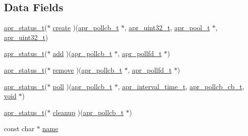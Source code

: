\subsection*{Data Fields}
\begin{DoxyCompactItemize}
\item 
\hyperlink{group__apr__errno_gaa5105fa83cc322f09382292db8b47593}{apr\+\_\+status\+\_\+t}($\ast$ \hyperlink{structapr__pollcb__provider__t_a692a11334282a65e72bae9b9ecb618bf}{create} )(\hyperlink{structapr__pollcb__t}{apr\+\_\+pollcb\+\_\+t} $\ast$, \hyperlink{group__apr__platform_ga558548a135d8a816c4787250744ea147}{apr\+\_\+uint32\+\_\+t}, \hyperlink{structapr__pool__t}{apr\+\_\+pool\+\_\+t} $\ast$, \hyperlink{group__apr__platform_ga558548a135d8a816c4787250744ea147}{apr\+\_\+uint32\+\_\+t})
\item 
\hyperlink{group__apr__errno_gaa5105fa83cc322f09382292db8b47593}{apr\+\_\+status\+\_\+t}($\ast$ \hyperlink{structapr__pollcb__provider__t_af48d581c174c9342b25425d6534a9a38}{add} )(\hyperlink{structapr__pollcb__t}{apr\+\_\+pollcb\+\_\+t} $\ast$, \hyperlink{structapr__pollfd__t}{apr\+\_\+pollfd\+\_\+t} $\ast$)
\item 
\hyperlink{group__apr__errno_gaa5105fa83cc322f09382292db8b47593}{apr\+\_\+status\+\_\+t}($\ast$ \hyperlink{structapr__pollcb__provider__t_a587ac036405acca0125e4cb32571683d}{remove} )(\hyperlink{structapr__pollcb__t}{apr\+\_\+pollcb\+\_\+t} $\ast$, \hyperlink{structapr__pollfd__t}{apr\+\_\+pollfd\+\_\+t} $\ast$)
\item 
\hyperlink{group__apr__errno_gaa5105fa83cc322f09382292db8b47593}{apr\+\_\+status\+\_\+t}($\ast$ \hyperlink{structapr__pollcb__provider__t_a7229a072271b269b3dd5fca868df01e3}{poll} )(\hyperlink{structapr__pollcb__t}{apr\+\_\+pollcb\+\_\+t} $\ast$, \hyperlink{group__apr__time_gaae2129185a395cc393f76fabf4f43e47}{apr\+\_\+interval\+\_\+time\+\_\+t}, \hyperlink{group__apr__poll_ga1dcd8c87e233dbf105e83d50ef601f55}{apr\+\_\+pollcb\+\_\+cb\+\_\+t}, \hyperlink{group__MOD__ISAPI_gacd6cdbf73df3d9eed42fa493d9b621a6}{void} $\ast$)
\item 
\hyperlink{group__apr__errno_gaa5105fa83cc322f09382292db8b47593}{apr\+\_\+status\+\_\+t}($\ast$ \hyperlink{structapr__pollcb__provider__t_a8f47c7658c52746e9cab16618c9e76e1}{cleanup} )(\hyperlink{structapr__pollcb__t}{apr\+\_\+pollcb\+\_\+t} $\ast$)
\item 
const char $\ast$ \hyperlink{structapr__pollcb__provider__t_ac4303695db9501a328d7dd52dae4d2d5}{name}
\end{DoxyCompactItemize}


